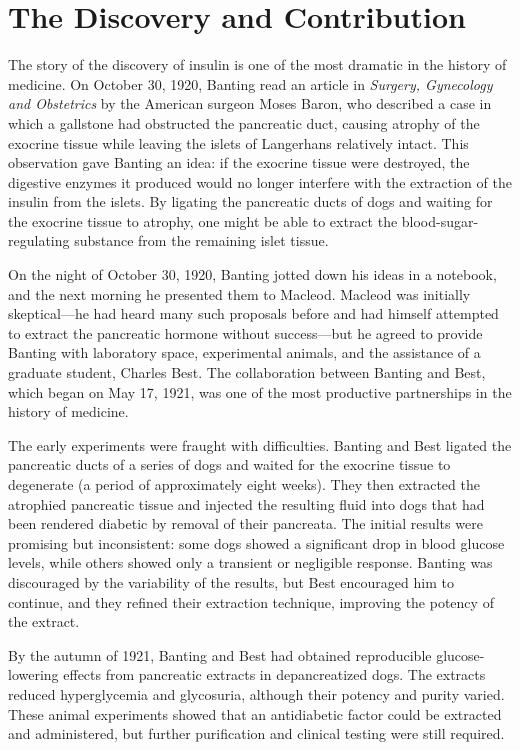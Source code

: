 \section{The Discovery and Contribution}

The story of the discovery of insulin is one of the most dramatic in the history of medicine. On October 30, 1920, Banting read an article in \emph{Surgery, Gynecology and Obstetrics} by the American surgeon Moses Baron, who described a case in which a gallstone had obstructed the pancreatic duct, causing atrophy of the exocrine tissue while leaving the islets of Langerhans relatively intact. This observation gave Banting an idea: if the exocrine tissue were destroyed, the digestive enzymes it produced would no longer interfere with the extraction of the insulin from the islets. By ligating the pancreatic ducts of dogs and waiting for the exocrine tissue to atrophy, one might be able to extract the blood-sugar-regulating substance from the remaining islet tissue.\cite{lecture-1923}

On the night of October 30, 1920, Banting jotted down his ideas in a notebook, and the next morning he presented them to Macleod. Macleod was initially skeptical---he had heard many such proposals before and had himself attempted to extract the pancreatic hormone without success---but he agreed to provide Banting with laboratory space, experimental animals, and the assistance of a graduate student, Charles Best. The collaboration between Banting and Best, which began on May 17, 1921, was one of the most productive partnerships in the history of medicine.\cite{lecture-1923}

The early experiments were fraught with difficulties. Banting and Best ligated the pancreatic ducts of a series of dogs and waited for the exocrine tissue to degenerate (a period of approximately eight weeks). They then extracted the atrophied pancreatic tissue and injected the resulting fluid into dogs that had been rendered diabetic by removal of their pancreata. The initial results were promising but inconsistent: some dogs showed a significant drop in blood glucose levels, while others showed only a transient or negligible response. Banting was discouraged by the variability of the results, but Best encouraged him to continue, and they refined their extraction technique, improving the potency of the extract.

By the autumn of 1921, Banting and Best had obtained reproducible glucose-lowering effects from pancreatic extracts in depancreatized dogs. The extracts reduced hyperglycemia and glycosuria, although their potency and purity varied. These animal experiments showed that an antidiabetic factor could be extracted and administered, but further purification and clinical testing were still required.\cite{banting-facts,lecture-1923}


